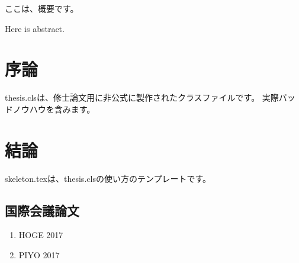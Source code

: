\documentclass{thesis}
\begin{document}
\begin{jabst} %
    ここは、概要です。
\end{jabst}
\begin{eabst} %
    Here is abstract.
\end{eabst}
\frontmatter
\tableofcontents %
\listoffigures %
\listoftables %

\mainmatter %
\chapter{序論}
thesis.clsは、修士論文用に非公式に製作されたクラスファイルです。
実際バッドノウハウを含みます。

\chapter{結論}
skeleton.texは、thesis.clsの使い方のテンプレートです。

\begin{thebibliography}{} %
\end{thebibliography}
%

\newpage
\section*{国際会議論文}
\begin{enumerate}[{1)}]
    \item HOGE 2017
    \item PIYO 2017
\end{enumerate}

\appendix %
\end{document}
